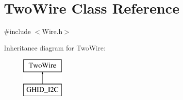 \hypertarget{class_two_wire}{\section{\-Two\-Wire \-Class \-Reference}
\label{class_two_wire}
}


{\ttfamily \#include $<$\-Wire.\-h$>$}

\-Inheritance diagram for \-Two\-Wire\-:\begin{figure}[H]
\begin{center}
\leavevmode
\includegraphics[height=2.000000cm]{class_two_wire}
\end{center}
\end{figure}
